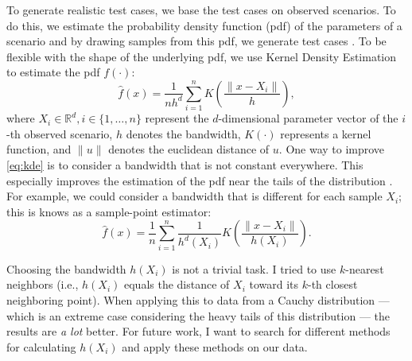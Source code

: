 \documentclass[10pt,final,a4paper,oneside,onecolumn]{article}
\begin{document}
To generate realistic test cases, we base the test cases on observed scenarios. To do this, we estimate the probability density function (pdf) of the parameters of a scenario and by drawing samples from this pdf, we generate test cases \autocite{deGelder2017assessment}. To be flexible with the shape of the underlying pdf, we use Kernel Density Estimation to estimate the pdf $f(\cdot)$:
\begin{equation} \label{eq:kde}
	\hat{f}(x) = \frac{1}{nh^d} \sum_{i=1}^n K\left( \frac{ \|x - X_i \| }{h} \right),
\end{equation}
where $X_i \in \mathds{R}^d, i\in\{1,\ldots,n\}$ represent the $d$-dimensional parameter vector of the $i$-th observed scenario, $h$ denotes the bandwidth, $K(\cdot)$ represents a kernel function, and $\|u\|$ denotes the euclidean distance of $u$. One way to improve \cref{eq:kde} is to consider a bandwidth that is not constant everywhere. This especially improves the estimation of the pdf near the tails of the distribution \autocite{sain1996locally,sain2002multivariate}. For example, we could consider a bandwidth that is different for each sample $X_i$; this is knows as a sample-point estimator:
\begin{equation}
	\hat{f}(x) = \frac{1}{n} \sum_{i=1}^n \frac{1}{h^d(X_i)} K\left( \frac{ \|x - X_i \| }{h(X_i)} \right).
\end{equation}

Choosing the bandwidth $h(X_i)$ is not a trivial task. I tried to use $k$-nearest neighbors (i.e., $h(X_i)$ equals the distance of $X_i$ toward its $k$-th closest neighboring point). When applying this to data from a Cauchy distribution --- which is an extreme case considering the heavy tails of this distribution --- the results are \emph{a lot} better. For future work, I want to search for different methods for calculating $h(X_i)$ and apply these methods on our data.
\end{document}
